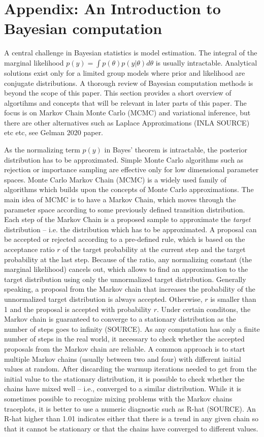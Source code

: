 \chapter{Appendix: An Introduction to Bayesian computation}

A central challenge in Bayesian statistics is model estimation.
The integral of the marginal likelihood $p(y) = \int p(\theta)p(y|\theta)d\theta$ is usually intractable.
Analytical solutions exist only for a limited group models where prior and likelihood are conjugate distributions.
A thorough review of Bayesian computation methods is beyond the scope of this paper.
This section provides a short overview of algortihms and concepts that will be relevant in later parts of this paper.
The focus is on Markov Chain Monte Carlo (MCMC) and variational inference, but there are other alternatives such as Laplace Approximations (INLA SOURCE) etc etc, see Gelman 2020 paper.

As the normalizing term $p(y)$ in Bayes' theorem is intractable, the posterior distribution has to be approximated.
Simple Monte Carlo algorithms such as rejection or importance sampling are effective only for low dimensional parameter spaces.
Monte Carlo Markov Chain (MCMC) is a widely used family of algorithms which builds upon the concepts of Monte Carlo approximations.
The main idea of MCMC is to have a Markov Chain, which moves through the parameter space according to some previously defined transition distribution.
Each step of the Markov Chain is a proposed sample to approximate the \textit{target} distribution – i.e. the distribution which has to be approximated.
A proposal can be accepted or rejected according to a pre-defined rule, which is based on the acceptance ratio $r$ of the target probability at the current step and the target probability at the last step.
Because of the ratio, any normalizing constant (the marginal likelihood) cancels out, which allows to find an approximation to the target distribution using only the unnormalized target distribution.
Generally speaking, a proposal from the Markov chain that increases the probability of the unnormalized target distribution is always accepted.
Otherwise, $r$ is smaller than 1 and the proposal is accepted with probability $r$.
Under certain conditons, the Markov chain is guaranteed to converge to a stationary distribution as the number of steps goes to infinity (SOURCE).
As any computation has only a finite number of steps in the real world, it necessary to check whether the accepted proposals from the Markov chain are reliable.
A common approach is to start multiple Markov chains (usually between two and four) with different initial values at random.
After discarding the warmup iterations needed to get from the initial value to the stationary distribution, it is possible to check whether the chains have mixed well – i.e., converged to a similar distribution.
While it is sometimes possible to recognize mixing problems with the Markov chains traceplots, it is better to use a numeric diagnostic such as R-hat (SOURCE).
An R-hat higher than 1.01 indicates either that there is a trend in any given chain so that it cannot be stationary or that the chains have converged to different values.

